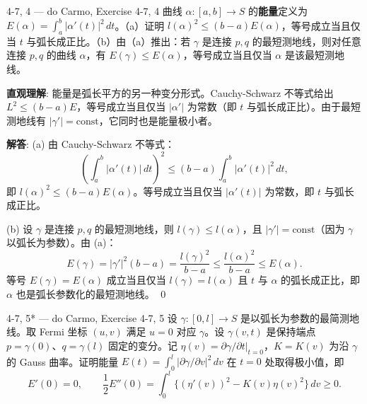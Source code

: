\begin{exercise}{4-7, 4 — do Carmo, Exercise 4-7, 4}
曲线 $\alpha: [a,b] \to S$ 的\textbf{能量}定义为 $E(\alpha) = \int_a^b |\alpha'(t)|^2\, dt$。（a）证明 $l(\alpha)^2 \leq (b-a)E(\alpha)$，等号成立当且仅当 $t$ 与弧长成正比。（b）由（a）推出：若 $\gamma$ 是连接 $p,q$ 的最短测地线，则对任意连接 $p,q$ 的曲线 $\alpha$，有 $E(\gamma) \leq E(\alpha)$，等号成立当且仅当 $\alpha$ 是该最短测地线。
\end{exercise}

\begin{solution}
\textbf{直观理解}: 能量是弧长平方的另一种变分形式。Cauchy-Schwarz 不等式给出 $L^2 \leq (b-a)E$，等号成立当且仅当 $|\alpha'|$ 为常数（即 $t$ 与弧长成正比）。由于最短测地线有 $|\gamma'|=\mathrm{const}$，它同时也是能量极小者。

\textbf{解答}: (a) 由 Cauchy-Schwarz 不等式：
\[
\left(\int_a^b |\alpha'(t)|\, dt\right)^2 \leq (b-a)\int_a^b |\alpha'(t)|^2\, dt,
\]
即 $l(\alpha)^2 \leq (b-a)E(\alpha)$。等号成立当且仅当 $|\alpha'(t)|$ 为常数，即 $t$ 与弧长成正比。

(b) 设 $\gamma$ 是连接 $p,q$ 的最短测地线，则 $l(\gamma) \leq l(\alpha)$，且 $|\gamma'| = \mathrm{const}$（因为 $\gamma$ 以弧长为参数）。由 (a)：
\[
E(\gamma) = |\gamma'|^2(b-a) = \frac{l(\gamma)^2}{b-a} \leq \frac{l(\alpha)^2}{b-a} \leq E(\alpha).
\]
等号 $E(\gamma)=E(\alpha)$ 成立当且仅当 $l(\gamma)=l(\alpha)$ 且 $t$ 与 $\alpha$ 的弧长成正比，即 $\alpha$ 也是弧长参数化的最短测地线。
\qed
\end{solution}

\begin{exercise}{4-7, 5* — do Carmo, Exercise 4-7, 5}
设 $\gamma: [0,l] \to S$ 是以弧长为参数的最简测地线。取 Fermi 坐标 $(u,v)$ 满足 $u=0$ 对应 $\gamma$。设 $\gamma(v,t)$ 是保持端点 $p=\gamma(0)$、$q=\gamma(l)$ 固定的变分。记 $\eta(v) = \partial\gamma/\partial t|_{t=0}$，$K=K(v)$ 为沿 $\gamma$ 的 Gauss 曲率。证明能量 $E(t) = \int_0^l |\partial\gamma/\partial v|^2\, dv$ 在 $t=0$ 处取得极小值，即
\[
E'(0) = 0,\qquad \frac12 E''(0) = \int_0^l\big\{(\eta'(v))^2 - K(v)\eta(v)^2\big\}\,dv \geq 0.
\]
\end{exercise}

